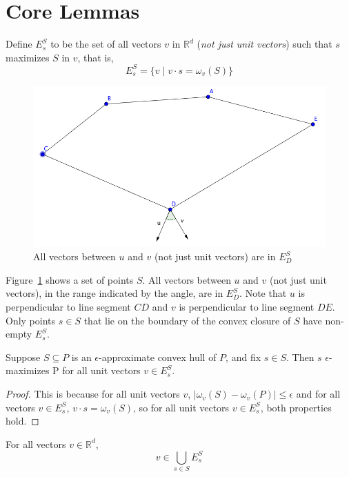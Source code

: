 \section{Core Lemmas}

\begin{definition}
Define $E^S_s$ to be the set of all vectors $v$ in $\mathbb{R}^d$ (\emph{not just unit vectors}) such that $s$ maximizes $S$ in $v$, that is,
\[ E^S_s = \{ v \; | \; v \cdot s = \omega_v(S) \} \]
\end{definition}

\begin{figure}[!htb]
\centering
\includegraphics[width=0.7\linewidth]{maximizing_vector_range}
\caption{All vectors between $u$ and $v$ (not just unit vectors) are in $E_D^S$}
\label{fig:maximizing_vector_range}
\end{figure}

Figure~\ref{fig:maximizing_vector_range} shows a set of points $S$. All vectors between $u$ and $v$ (not just unit vectors), in the range indicated by the angle, are in $E_D^S$. Note that $u$ is perpendicular to line segment $CD$ and $v$ is perpendicular to line segment $DE$. Only points $s \in S$ that lie on the boundary of the convex closure of $S$ have non-empty $E_s^S$.

\begin{lemma} Suppose $S \subseteq P$ is an $\epsilon$-approximate convex hull of $P$, and fix $s \in S$. Then $s$ $\epsilon$-maximizes P for all unit vectors $v \in E^S_s$.
\end{lemma}

\begin{proof}
This is because for all unit vectors $v$, $|\omega_v(S) - \omega_v(P)| \leq \epsilon$ and for all vectors $v \in E^S_s$, $v \cdot s = \omega_v(S)$, so for all unit vectors $v \in E^S_s$, both properties hold.
\end{proof}

\begin{lemma} For all vectors $v \in \mathbb{R}^d$,
\[ v \in \bigcup_{s \in S} E^S_s \]
\end{lemma}

